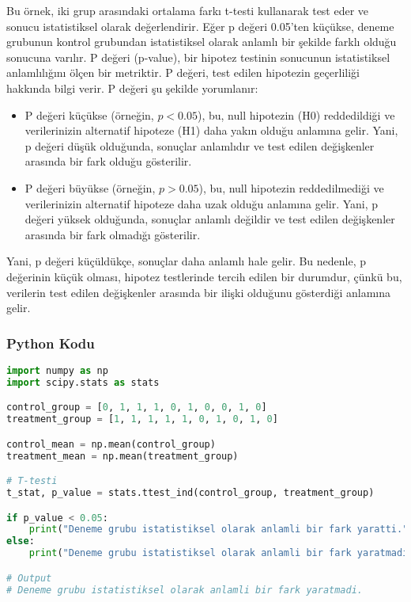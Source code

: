 Bu örnek, iki grup arasındaki ortalama farkı t-testi kullanarak test eder ve sonucu istatistiksel olarak değerlendirir. Eğer p değeri 0.05'ten küçükse, deneme grubunun kontrol grubundan istatistiksel olarak anlamlı bir şekilde farklı olduğu sonucuna varılır. P değeri (p-value), bir hipotez testinin sonucunun istatistiksel anlamlılığını ölçen bir metriktir. P değeri, test edilen hipotezin geçerliliği hakkında bilgi verir. P değeri şu şekilde yorumlanır:
\begin{itemize}
    \item P değeri küçükse (örneğin, $p < 0.05$), bu, null hipotezin (H0) reddedildiği ve verilerinizin alternatif hipoteze (H1) daha yakın olduğu anlamına gelir. Yani, p değeri düşük olduğunda, sonuçlar anlamlıdır ve test edilen değişkenler arasında bir fark olduğu gösterilir.
    \item P değeri büyükse (örneğin, $p > 0.05$), bu, null hipotezin reddedilmediği ve verilerinizin alternatif hipoteze daha uzak olduğu anlamına gelir. Yani, p değeri yüksek olduğunda, sonuçlar anlamlı değildir ve test edilen değişkenler arasında bir fark olmadığı gösterilir.
\end{itemize}

Yani, p değeri küçüldükçe, sonuçlar daha anlamlı hale gelir. Bu nedenle, p değerinin küçük olması, hipotez testlerinde tercih edilen bir durumdur, çünkü bu, verilerin test edilen değişkenler arasında bir ilişki olduğunu gösterdiği anlamına gelir.

\subsubsection{Python Kodu}

\begin{lstlisting}[language=Python]
import numpy as np
import scipy.stats as stats

control_group = [0, 1, 1, 1, 0, 1, 0, 0, 1, 0]
treatment_group = [1, 1, 1, 1, 1, 0, 1, 0, 1, 0]

control_mean = np.mean(control_group)
treatment_mean = np.mean(treatment_group)

# T-testi
t_stat, p_value = stats.ttest_ind(control_group, treatment_group)

if p_value < 0.05:
    print("Deneme grubu istatistiksel olarak anlamli bir fark yaratti.")
else:
    print("Deneme grubu istatistiksel olarak anlamli bir fark yaratmadi.")

# Output
# Deneme grubu istatistiksel olarak anlamli bir fark yaratmadi.
\end{lstlisting}

